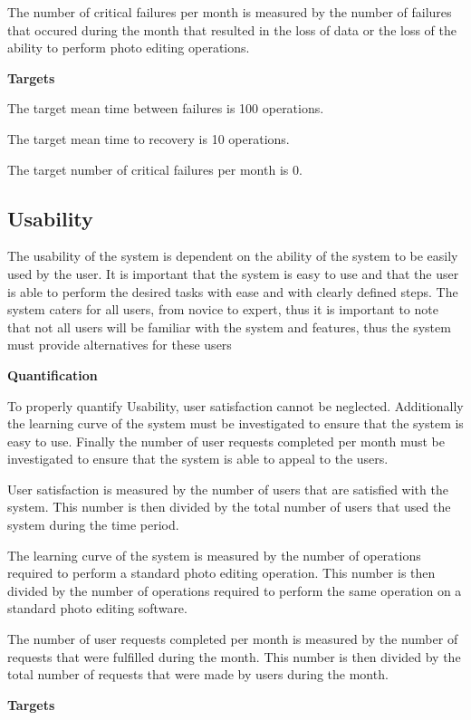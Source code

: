 \documentclass[11pt,a4paper]{article}
\begin{document}
The number of critical failures per month is measured by the number of failures that occured during the month that resulted in the loss of data or the loss of the ability to perform photo editing operations.

{\bf Targets}

The target mean time between failures is 100 operations.

The target mean time to recovery is 10 operations.

The target number of critical failures per month is 0.



\subsection*{Usability} 

The usability of the system is dependent on the ability of the system to be easily used by the user. It is important that the system is easy to use and that the 
user is able to perform the desired tasks with ease and with clearly defined steps. The system caters for all users, from novice to expert, thus it is important to note that not all users
will be familiar with the system and features, thus the system must provide alternatives for these users

{\bf Quantification}

To properly quantify Usability, user satisfaction cannot be neglected. Additionally the learning curve of the system must be investigated to ensure that the system is easy to use.
Finally the number of user requests completed per month must be investigated to ensure that the system is able to appeal to the users.

User satisfaction is measured by the number of users that are satisfied with the system. This number is then divided by the total number of users that used the system during the time period.

The learning curve of the system is measured by the number of operations required to perform a standard photo editing operation. This number is then divided by the number of operations required to perform the same operation on a standard photo editing software.

The number of user requests completed per month is measured by the number of requests that were fulfilled during the month. This number is then divided by the total number of requests that were made by users during the month.

{\bf Targets}
\end{document}
